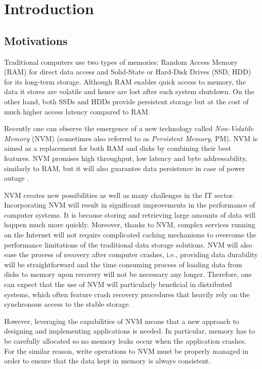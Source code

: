 \chapter{Introduction} \label{Introduction}

\section{Motivations}

Traditional computers use two types of memories: Random Access Memory (RAM) for direct data access and Solid-State or Hard-Disk Drives (SSD, HDD) for its long-term storage. Although RAM enables quick access to memory, the data it stores are volatile and hence are lost after each system shutdown. On the other hand, both SSDs and HDDs provide persistent storage but at the cost of much higher access latency compared to RAM.

Recently one can observe the emergence of a new technology called \emph{Non-Volatile Memory} (NVM) (sometimes also referred to as \emph{Persistent Memory}, PM). NVM is aimed as a replacement for both RAM and disks by combining their best features. NVM promises high throughput, low latency and byte addressability, similarly to RAM, but it will also guarantee data persistence in case of power outage \cite{NvmPerformanceArticle}. 

NVM creates new possibilities as well as many challenges in the IT sector. Incorporating NVM will result in significant improvements in the performance of computer systems. It is because storing and retrieving large amounts of data will happen much more quickly. Moreover, thanks to NVM, complex services running on the Internet will not require complicated caching mechanisms to overcome the performance limitations of the traditional data storage solutions. NVM will also ease the process of recovery after computer crashes, i.e., providing data durability will be straightforward and the time consuming process of loading data from disks to memory upon recovery will not be necessary any longer. Therefore, one can expect that the use of NVM will particularly beneficial in distributed systems, which often feature crash recovery procedures that heavily rely on the synchronous access to the stable storage. 

However, leveraging the capabilities of NVM means that a new approach to designing and implementing applications is needed. In particular, memory has to be carefully allocated so no memory leaks occur when the application crashes. For the similar reason, write operations to NVM must be properly managed in order to ensure that the data kept in memory is always consistent.

